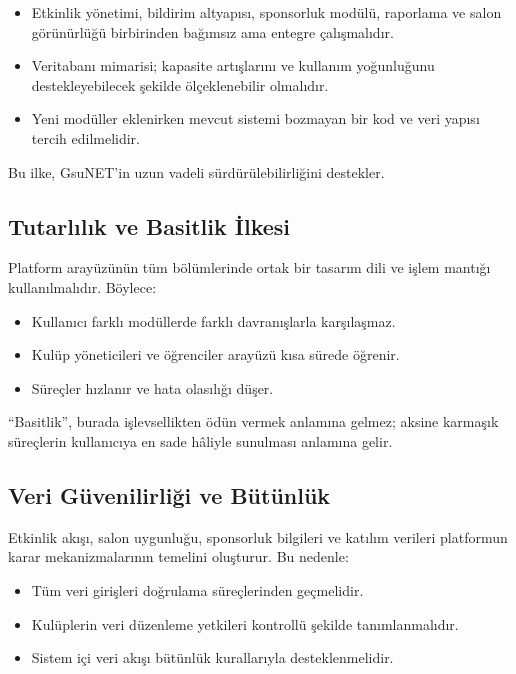 \documentclass[a4paper,12pt]{report}
\begin{document}
\begin{itemize}
    \item Etkinlik yönetimi, bildirim altyapısı, sponsorluk modülü, raporlama ve salon görünürlüğü birbirinden bağımsız ama entegre çalışmalıdır.
    \item Veritabanı mimarisi; kapasite artışlarını ve kullanım yoğunluğunu destekleyebilecek şekilde ölçeklenebilir olmalıdır.
    \item Yeni modüller eklenirken mevcut sistemi bozmayan bir kod ve veri yapısı tercih edilmelidir.
\end{itemize}

Bu ilke, GsuNET’in uzun vadeli sürdürülebilirliğini destekler.

\subsection{Tutarlılık ve Basitlik İlkesi}

Platform arayüzünün tüm bölümlerinde ortak bir tasarım dili ve işlem mantığı kullanılmalıdır. Böylece:

\begin{itemize}
    \item Kullanıcı farklı modüllerde farklı davranışlarla karşılaşmaz.
    \item Kulüp yöneticileri ve öğrenciler arayüzü kısa sürede öğrenir.
    \item Süreçler hızlanır ve hata olasılığı düşer.
\end{itemize}

“Basitlik”, burada işlevsellikten ödün vermek anlamına gelmez; aksine karmaşık süreçlerin kullanıcıya en sade hâliyle sunulması anlamına gelir.

\subsection{Veri Güvenilirliği ve Bütünlük}

Etkinlik akışı, salon uygunluğu, sponsorluk bilgileri ve katılım verileri platformun karar mekanizmalarının temelini oluşturur. Bu nedenle:

\begin{itemize}
    \item Tüm veri girişleri doğrulama süreçlerinden geçmelidir.
    \item Kulüplerin veri düzenleme yetkileri kontrollü şekilde tanımlanmalıdır.
    \item Sistem içi veri akışı bütünlük kurallarıyla desteklenmelidir.
\end{itemize}
\end{document}
